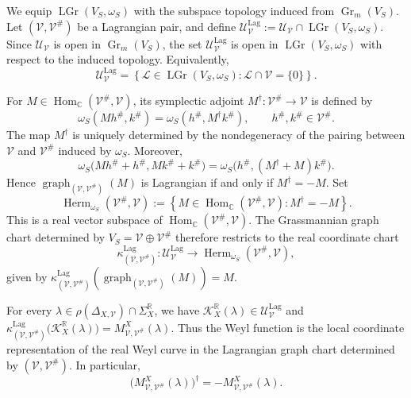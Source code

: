 \documentclass[12pt]{amsart}
\theoremstyle{plain}
\theoremstyle{definition}
\theoremstyle{remark}
\numberwithin{equation}{section} \numberwithin{figure}{section}
\renewcommand*{\to}{\rightarrow}
\newcommand{\mb}[1]{\mathbb{#1}} %
\newcommand{\mc}[1]{\mathcal{#1}}
\begin{document}
We equip \(\operatorname{LGr}(V_S,\omega_S)\) with the subspace
topology induced from \(\operatorname{Gr}_m(V_S)\). Let
\((\mc V,\mc V^\#)\) be a Lagrangian pair, and define
\(
    \mc U_{\mc V}^{\operatorname{Lag}}
    :=
    \mc U_{\mc V}
    \cap
    \operatorname{LGr}(V_S,\omega_S).
\)
Since \(\mc U_{\mc V}\) is open in
\(\operatorname{Gr}_m(V_S)\), the set
\(\mc U_{\mc V}^{\operatorname{Lag}}\) is open in
\(\operatorname{LGr}(V_S,\omega_S)\) with respect to the induced
topology. Equivalently,
\[
    \mc U_{\mc V}^{\operatorname{Lag}}
    =
    \left\{
        \mc L\in\operatorname{LGr}(V_S,\omega_S):
        \mc L\cap\mc V=\{0\}
    \right\}.
\]

For \(M\in\operatorname{Hom}_{\mb C}(\mc V^\#,\mc V)\), its
symplectic adjoint
\(M^\dagger:\mc V^\#\to\mc V\) is defined by
\[
    \omega_S(Mh^\#,k^\#)
    =
    \omega_S(h^\#,M^\dagger k^\#),
    \qquad
    h^\#,k^\#\in\mc V^\#.
\]
The map \(M^\dagger\) is uniquely determined by the nondegeneracy of
the pairing between \(\mc V\) and \(\mc V^\#\) induced by
\(\omega_S\). Moreover,
\[
    \omega_S
    \bigl(
        Mh^\#+h^\#,
        Mk^\#+k^\#
    \bigr)
    =
    \omega_S
    \bigl(
        h^\#,
        (M^\dagger+M)k^\#
    \bigr).
\]
Hence
\(\operatorname{graph}_{(\mc V,\mc V^\#)}(M)\) is Lagrangian if and
only if \(M^\dagger=-M\). Set
\[
    \operatorname{Herm}_{\omega_S}(\mc V^\#,\mc V)
    :=
    \left\{
        M\in\operatorname{Hom}_{\mb C}(\mc V^\#,\mc V):
        M^\dagger=-M
    \right\}.
\]
This is a real vector subspace of
\(\operatorname{Hom}_{\mb C}(\mc V^\#,\mc V)\). The Grassmannian
graph chart determined by \(V_S=\mc V\oplus\mc V^\#\) therefore
restricts to the real coordinate chart
\[
    \kappa_{(\mc V,\mc V^\#)}^{\operatorname{Lag}}:
    \mc U_{\mc V}^{\operatorname{Lag}}
    \longrightarrow
    \operatorname{Herm}_{\omega_S}(\mc V^\#,\mc V),
\]
given by
\(
    \kappa_{(\mc V,\mc V^\#)}^{\operatorname{Lag}}
    \left(
        \operatorname{graph}_{(\mc V,\mc V^\#)}(M)
    \right)
    =
    M.
\)

For every
\(\lambda\in\rho(\Delta_{X,\mc V})\cap\Sigma_X^{\mb R}\), we have
\(
    \mc K_X^{\mb R}(\lambda)
    \in
    \mc U_{\mc V}^{\operatorname{Lag}}
\)
and
\(
    \kappa_{(\mc V,\mc V^\#)}^{\operatorname{Lag}}
    \bigl(\mc K_X^{\mb R}(\lambda)\bigr)
    =
    M_{\mc V,\mc V^\#}^X(\lambda).
\)
Thus the Weyl function is the local coordinate representation of the
real Weyl curve in the Lagrangian graph chart determined by
\((\mc V,\mc V^\#)\). In particular,
\[
    \bigl(M_{\mc V,\mc V^\#}^X(\lambda)\bigr)^\dagger
    =
    -M_{\mc V,\mc V^\#}^X(\lambda).
\]
\end{document}
